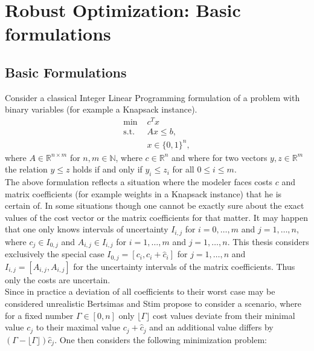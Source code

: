 \documentclass[titlepage, a4paper]{amsbook}
\newcommand{\R}{\ensuremath{\mathbb{R}}}
\newcommand{\N}{\ensuremath{\mathbb{N}}}
\theoremstyle{plain}
\theoremstyle{break}
\theoremstyle{definition}
\theoremstyle{remark}
\numberwithin{equation}{thm}
\begin{document}
\chapter{Robust Optimization: Basic formulations}
\section{Basic Formulations}
Consider a classical Integer Linear Programming formulation of a problem with binary variables (for example a Knapsack instance).
\begin{align*}
    \text{min } &c^T x \\
    \text{s.t. } &Ax \leq b, \\
    &x \in \{0,1\}^n,
\end{align*}
where $A \in \R^{n \times m}$ for $n,m \in \N$, where $c \in \R^n$ and where for two vectors $y,z \in \R^m$ the relation $y \leq z$ holds if and only if $y_i \leq z_i$ for all $0 \leq i \leq m$.\\
The above formulation reflects a situation where the modeler faces costs $c$ and matrix coefficients (for example weights in a Knapsack instance) that he is certain of. In some situations though one cannot be exactly sure about the exact values of the cost vector or the matrix coefficients for that matter. It may happen that one only knows intervals of uncertainty $I_{i,j}$ for $i=0,\ldots,m$ and $j=1,\ldots,n$, where $c_j \in I_{0,j}$
and $A_{i,j} \in I_{i,j}$ for $i=1, \ldots, m$ and $j=1, \ldots, n$. This thesis considers exclusively the special case $I_{0,j}=[c_i, c_i + \hat{c}_i]$ for $j=1, \ldots, n$ and $I_{i,j}=[A_{i,j},A_{i,j}]$ for the uncertainty intervals of the matrix coefficients. Thus only the costs are uncertain. \\
Since in practice a deviation of all coefficients to their worst case may be considered unrealistic Bertsimas and Stim propose to consider a scenario, where for a fixed number $\Gamma \in [0,n]$ only $\lfloor \Gamma \rfloor$ cost values deviate from their minimal value $c_j$ to their maximal value $c_j + \hat{c}_j$ and an additional value differs by $(\Gamma - \lfloor \Gamma \rfloor)\hat{c}_j$. One then considers the following minimization problem:
\end{document}
